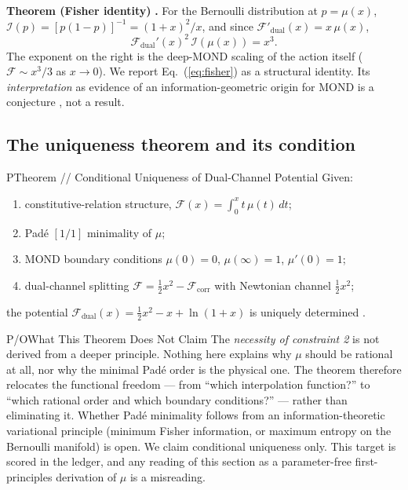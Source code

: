 \documentclass[aps,prd,preprint,superscriptaddress,nofootinbib,amsmath,amssymb,floatfix]{revtex4-2}
\makeatletter
\DeclareRobustCommand{\_}{%
    \ifmmode\nfss@text{\textunderscore}\else\textunderscore\penalty\z@\fi}%
\makeatother
\begin{document}
\textbf{Theorem (Fisher identity)} \textbf{.} For the Bernoulli distribution at $p = \mu(x)$, $\mathcal{I}(p) = [p(1-p)]^{-1} = (1+x)^2/x$, and since $\mathcal{F}'_{\text{dual}}(x) = x\,\mu(x)$,
\begin{equation}
\label{eq:fisher}
\mathcal{F}_{\text{dual}}'(x)^2\,\mathcal{I}(\mu(x)) = x^3 .
\end{equation}
The exponent on the right is the deep-MOND scaling of the action itself ($\mathcal{F}\sim x^3/3$ as $x\to0$). We report Eq.~(\ref{eq:fisher}) as a structural identity. Its \emph{interpretation} as evidence of an information-geometric origin for MOND is a conjecture , not a result.

\subsection{The uniqueness theorem and its condition}

\begin{gate}{P}{Theorem // Conditional Uniqueness of Dual-Channel Potential}
Given:
\begin{enumerate}
    \item constitutive-relation structure, $\mathcal{F}(x) = \int_0^x t\,\mu(t)\,dt$;
    \item Pad\'e $[1/1]$ minimality of $\mu$;
    \item MOND boundary conditions $\mu(0)=0$, $\mu(\infty)=1$, $\mu'(0)=1$;
    \item dual-channel splitting $\mathcal{F} = \tfrac{1}{2}x^2 - \mathcal{F}_{\text{corr}}$ with Newtonian channel $\tfrac{1}{2}x^2$;
\end{enumerate}
the potential $\mathcal{F}_{\text{dual}}(x) = \tfrac{1}{2}x^2 - x + \ln(1+x)$ is uniquely determined .
\end{gate}

\begin{gate}{P/O}{What This Theorem Does Not Claim}
The \emph{necessity of constraint 2} is not derived from a deeper principle. Nothing here explains why $\mu$ should be rational at all, nor why the minimal Pad\'e order is the physical one. The theorem therefore relocates the functional freedom --- from ``which interpolation function?'' to ``which rational order and which boundary conditions?'' --- rather than eliminating it. Whether Pad\'e minimality follows from an information-theoretic variational principle (minimum Fisher information, or maximum entropy on the Bernoulli manifold) is open. We claim conditional uniqueness only. This target is scored  in the ledger, and any reading of this section as a parameter-free first-principles derivation of $\mu$ is a misreading.
\end{gate}
\end{document}
